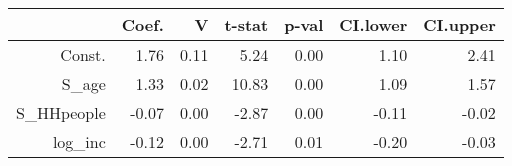 \begin{table}[ht]
\centering
\begin{tabular}{rrrrrrr}
  \hline
 & Coef. & V & t-stat & p-val & CI.lower & CI.upper \\ 
  \hline
Const. & 1.76 & 0.11 & 5.24 & 0.00 & 1.10 & 2.41 \\ 
  S\_age & 1.33 & 0.02 & 10.83 & 0.00 & 1.09 & 1.57 \\ 
  S\_HHpeople & -0.07 & 0.00 & -2.87 & 0.00 & -0.11 & -0.02 \\ 
  log\_inc & -0.12 & 0.00 & -2.71 & 0.01 & -0.20 & -0.03 \\ 
   \hline
\end{tabular}
\end{table}
